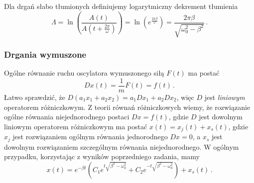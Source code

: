 \documentclass[../main.tex]{subfiles}
\begin{document}
    Dla drgań słabo tłumionych definiujemy logarytmiczny dekrement tłumienia
    \begin{equation*}
        \Lambda=\ln\left(\frac{A(t)}{A\left(t+\frac{2\pi}{\omega}\right)}\right)=\ln\left(e^{\frac{2\pi\beta}{\omega}}\right)=\frac{2\pi\beta}{\sqrt{\omega_0^2-\beta^2}}\,.
    \end{equation*}
    \subsubsection{Drgania wymuszone}
    Ogólne równanie ruchu oscylatora wymuszonego siłą \(F(t)\) ma postać
    \begin{equation*}
        Dx(t)=\frac{1}{m}F(t)=f(t)\,.
    \end{equation*}
    Łatwo sprawdzić, że \(D(a_1x_1+a_2x_2)=a_1Dx_1+a_2Dx_2\), więc \(D\) jest \textit{liniowym} operatorem różniczkowym. Z teorii równań różniczkowych wiemy, że rozwiązanie ogólne równania niejednorodnego postaci \(Dx=f(t)\), gdzie \(D\) jest dowolnym liniowym operatorem różniczkowym ma postać \(x(t)=x_j(t)+x_s(t)\), gdzie \(x_j\) jest rozwiązaniem ogólnym równania jednorodnego \(Dx=0\), a \(x_s\) jest dowolnym rozwiązaniem szczególnym równania niejednorodnego. W ogólnym przypadku, korzystając z wyników poprzedniego zadania, mamy 
    \begin{equation*}
        x(t)=e^{-\beta t}\left(C_1e^{t\sqrt{\beta^2-\omega_0^2}}+C_2e^{-t\sqrt{\beta^2-\omega_0^2}}\right)+x_s(t)\,.
    \end{equation*}
\end{document}
